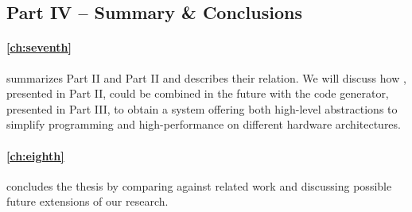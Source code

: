 \subsection*{Part IV -- Summary \& Conclusions}

\paragraph{\autoref{ch:seventh}} summarizes Part II and Part II and describes their relation.
We will discuss how \SkelCL, presented in Part II, could be combined in the future with the code generator, presented in Part III, to obtain a system offering both high-level abstractions to simplify programming and high-performance on different hardware architectures.

\paragraph{\autoref{ch:eighth}} concludes the thesis by comparing against related work and discussing possible future extensions of our research.


